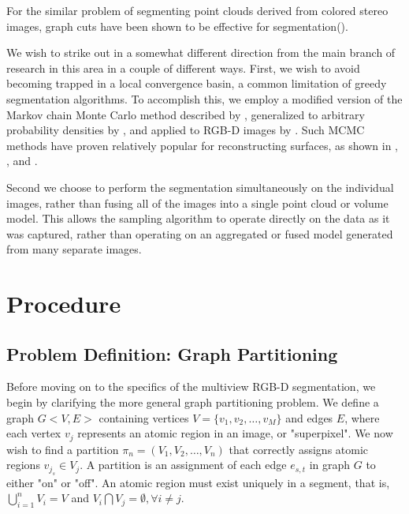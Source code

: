 \documentclass[10pt,letterpaper]{article}
\begin{document}
	For the similar problem of segmenting point clouds derived from colored stereo images, graph cuts have been shown to be effective for segmentation(\cite{bleyer2005graph}).

	
	We wish to strike out in a somewhat different direction from the main branch of research in this area in a couple of different ways. First, we wish to avoid becoming trapped in a local convergence basin, a common limitation of greedy segmentation algorithms. To accomplish this, we employ a modified version of the Markov chain Monte Carlo method described by \cite{swendsen1987nonuniversal}, generalized to arbitrary probability densities by \cite{barbu2005generalizing}, and applied to RGB-D images by \cite{Erdogan12crv}. Such MCMC methods have proven relatively popular for reconstructing surfaces, as shown in \cite{tu2002image}, \cite{qiu2009jump}, and 	\cite{dick2002bayesian}.
	
	Second we choose to perform the segmentation simultaneously on the individual images, rather than fusing all of the images into a single point cloud or volume model. This allows the sampling algorithm to operate directly on the data as it was captured, rather than operating on an aggregated or fused model generated from many separate images.
	
	
	
\cite{metropolis1953equation}



\section{Procedure}

\subsection{Problem Definition: Graph Partitioning}

	Before moving on to the specifics of the multiview RGB-D segmentation, we begin by clarifying the more general graph partitioning problem. We define a graph $G<V,E>$ containing vertices $V=\{v_1,v_2,\ldots,v_M\}$ and edges $E$, where each vertex $v_j$ represents an atomic region in an image, or "superpixel". We now wish to find a partition $\pi_n=(V_1,V_2,\ldots,V_n)$ that correctly assigns atomic regions  $v_{j_s}\in{V_j}$. A partition is an assignment of each edge $e_{s,t}$ in graph $G$ to either "on" or "off". An atomic region must exist uniquely in a segment, that is, $\bigcup_{i=1}^{n}V_i=V$ and $V_i\bigcap{V_j}=\emptyset,\forall{i}\neq{j}$.
	
\end{document}
